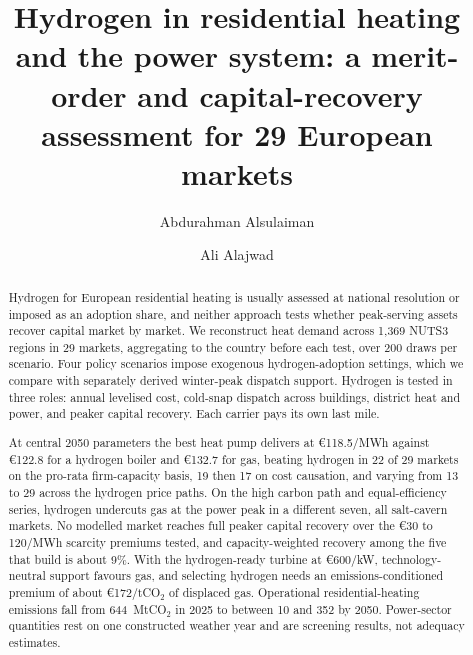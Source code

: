 \documentclass[review]{elsarticle}
\begin{document}
\begin{frontmatter}

\title{Hydrogen in residential heating and the power system: a merit-order and capital-recovery assessment for 29 European markets}

\author[oies]{Abdurahman Alsulaiman}
\author[jhu,cornell]{Ali Alajwad}

\begin{abstract}
Hydrogen for European residential heating is usually assessed at national resolution or imposed as an adoption share, and neither approach tests whether peak-serving assets recover capital market by market. We reconstruct heat demand across 1{,}369 NUTS3 regions in 29 markets, aggregating to the country before each test, over 200 draws per scenario. Four policy scenarios impose exogenous hydrogen-adoption
settings, which we compare with separately derived winter-peak dispatch support. Hydrogen is tested in three roles: annual levelised cost, cold-snap dispatch across buildings, district heat and power, and peaker capital recovery. Each carrier pays its own last mile.

At central 2050 parameters the best heat pump delivers at \euro{}118.5/MWh against
\euro{}122.8 for a hydrogen boiler and \euro{}132.7 for gas, beating hydrogen in 22 of 29 markets on the pro-rata firm-capacity basis, 19 then 17 on cost causation, and varying from 13 to 29 across the hydrogen price paths. On the high carbon path and equal-efficiency series, hydrogen undercuts gas at the power peak in a different seven, all salt-cavern markets. No modelled market reaches full peaker capital recovery over the \euro{}30 to 120/MWh scarcity premiums tested, and capacity-weighted recovery among the five that build is about 9\%. With the hydrogen-ready turbine at \euro{}600/kW, technology-neutral support favours gas, and selecting hydrogen needs an emissions-conditioned premium of about \euro{}172/tCO$_2$ of displaced gas.
Operational residential-heating emissions fall from 644~MtCO$_2$ in 2025 to between 10 and 352 by 2050. Power-sector quantities rest on one constructed weather year and are screening results, not adequacy estimates.
\end{abstract}


\end{frontmatter}
\end{document}
